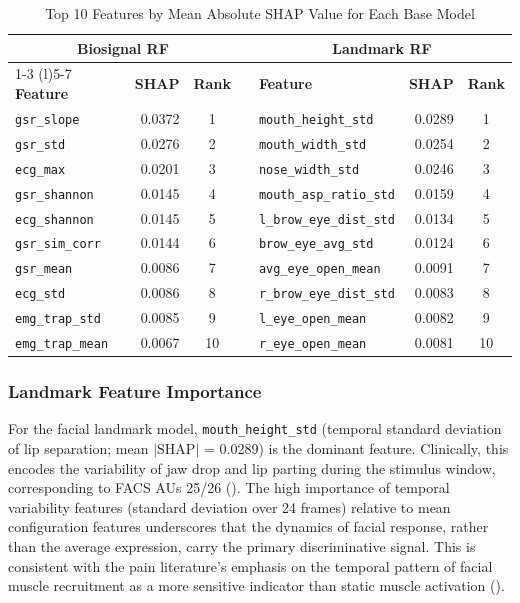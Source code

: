 \documentclass[10pt, twocolumn]{article}
\begin{document}
\begin{table}[tbp]
\centering
\caption{Top 10 Features by Mean Absolute SHAP Value for Each Base Model}
\label{tab:shap}
\small
\begin{tabular}{lrcclrc}
\toprule
\multicolumn{3}{c}{\textbf{Biosignal RF}} & \quad &
\multicolumn{3}{c}{\textbf{Landmark RF}} \\
\cmidrule(r){1-3} \cmidrule(l){5-7}
\textbf{Feature} & \textbf{SHAP} & \textbf{Rank} & &
\textbf{Feature} & \textbf{SHAP} & \textbf{Rank} \\
\midrule
\texttt{gsr\_slope}       & 0.0372 & 1 & & \texttt{mouth\_height\_std}     & 0.0289 & 1 \\
\texttt{gsr\_std}         & 0.0276 & 2 & & \texttt{mouth\_width\_std}      & 0.0254 & 2 \\
\texttt{ecg\_max}         & 0.0201 & 3 & & \texttt{nose\_width\_std}       & 0.0246 & 3 \\
\texttt{gsr\_shannon}     & 0.0145 & 4 & & \texttt{mouth\_asp\_ratio\_std} & 0.0159 & 4 \\
\texttt{ecg\_shannon}     & 0.0145 & 5 & & \texttt{l\_brow\_eye\_dist\_std}& 0.0134 & 5 \\
\texttt{gsr\_sim\_corr}   & 0.0144 & 6 & & \texttt{brow\_eye\_avg\_std}    & 0.0124 & 6 \\
\texttt{gsr\_mean}        & 0.0086 & 7 & & \texttt{avg\_eye\_open\_mean}   & 0.0091 & 7 \\
\texttt{ecg\_std}         & 0.0086 & 8 & & \texttt{r\_brow\_eye\_dist\_std}& 0.0083 & 8 \\
\texttt{emg\_trap\_std}   & 0.0085 & 9 & & \texttt{l\_eye\_open\_mean}     & 0.0082 & 9 \\
\texttt{emg\_trap\_mean}  & 0.0067 & 10& & \texttt{r\_eye\_open\_mean}     & 0.0081 & 10\\
\bottomrule
\end{tabular}
\end{table}

\subsubsection{Landmark Feature Importance}

For the facial landmark model, \texttt{mouth\_height\_std} (temporal standard deviation
of lip separation; mean $|\text{SHAP}|$ = 0.0289) is the dominant feature. Clinically,
this encodes the variability of jaw drop and lip parting during the stimulus window,
corresponding to FACS AUs 25/26 (\cite{Prkachin2008}). The high importance of temporal
variability features (standard deviation over 24 frames) relative to mean configuration
features underscores that the dynamics of facial response, rather than the average
expression, carry the primary discriminative signal. This is consistent with the pain
literature's emphasis on the temporal pattern of facial muscle recruitment as a more
sensitive indicator than static muscle activation (\cite{Kunz2019}).
\end{document}
